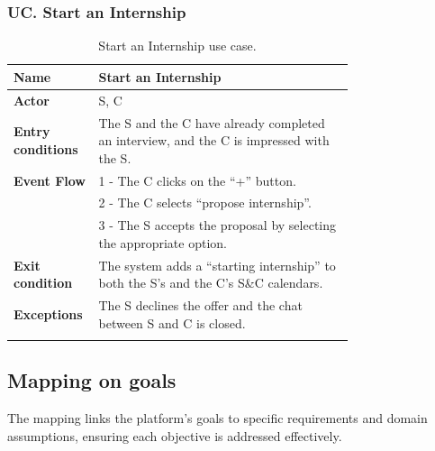 \subsubsection*{UC\cuc . Start an Internship}
\begin{center}
    \begin{longtable}{|l|p{0.75\linewidth}|}
        \hline
        \textbf{Name}               & Start an Internship\\
        \hline
        \textbf{Actor}              & S, C\\
        \hline
        \textbf{Entry conditions}   & The S and the C have already completed an interview, and the C is impressed with the S.\\
        \hline
        \textbf{Event Flow}         & 1 - The C clicks on the “+” button. \\
        & 2 - The C selects “propose internship”. \\
        & 3 - The S accepts the proposal by selecting the appropriate option. \\
        \hline
        \textbf{Exit condition}   & The system adds a “starting internship” to both the S’s and the C’s S\&C calendars. \\       
        \hline
        \textbf{Exceptions}       & The S declines the offer and the chat between S and C is closed. \\
        \hline
        \caption{Start an Internship use case.}
        \label{tab: start_internship_use_case}
    \end{longtable}
\end{center}


\subsection{Mapping on goals}
\label{subsec:mapping_on_goals}%

The mapping links the platform's goals to specific
requirements and domain assumptions, ensuring each objective is
addressed effectively.

